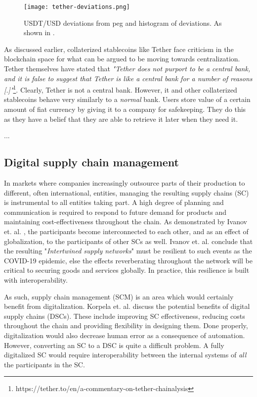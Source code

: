 \begin{figure}
  \texttt{[image: tether-deviations.png]}
  \caption{USDT/USD deviations from peg and histogram of deviations.
  As shown in \cite{lyonsStable}.}
  \label{fig:tether-deviations}
\end{figure}

As discussed earlier, collaterized stablecoins like Tether face
criticism in the blockchain space for what can be argued to be moving
towards centralization. Tether themselves have stated that
\textit{"Tether does not purport to be a central bank, and it is false
to suggest that Tether is like a central bank for a number of reasons
[.]"}\footnote{https://tether.to/en/a-commentary-on-tether-chainalysis}.
Clearly, Tether is not a central bank. However, it and other
collaterized stablecoins behave very similarly to a \textit{normal}
bank. Users store value of a certain amount of fiat currency by giving
it to a company for safekeeping. They do this as they have a belief
that they are able to retrieve it later when they need it. 


...

\subsection{Digital supply chain management}

In markets where companies increasingly outsource parts of their
production to different, often international, entities, managing the
resulting supply chains (SC) is instrumental to all entities taking
part. A high degree of planning and communication is required to
respond to future demand for products and maintaining
cost-effectiveness throughout the chain. As demonstrated by Ivanov et.
al. \cite{ivanovIntertwined}, the participants become interconnected
to each other, and as an effect of globalization, to the participants
of other SCs as well. Ivanov et. al. conclude that the resulting
"\textit{Intertwined supply networks}" must be resilient to such
events as the COVID-19 epidemic, else the effects reverberating
throughout the network will be critical to securing goods and
services globally. In practice, this resilience is built with interoperability.

As such, supply chain management (SCM) is an area which would
certainly benefit from digitalization. Korpela et. al.
\cite{korpelaDSC} discuss the potential benefits of digital supply
chains (DSCs). These include improving SC effectiveness, reducing
costs throughout the chain and providing flexibility in designing
them. Done properly, digitalization would also decrease human error as
a consequence of automation.  However, converting an SC to a DSC is
quite a difficult problem. A fully digitalized SC would require
interoperability between the internal systems of \textit{all} the
participants in the SC.

